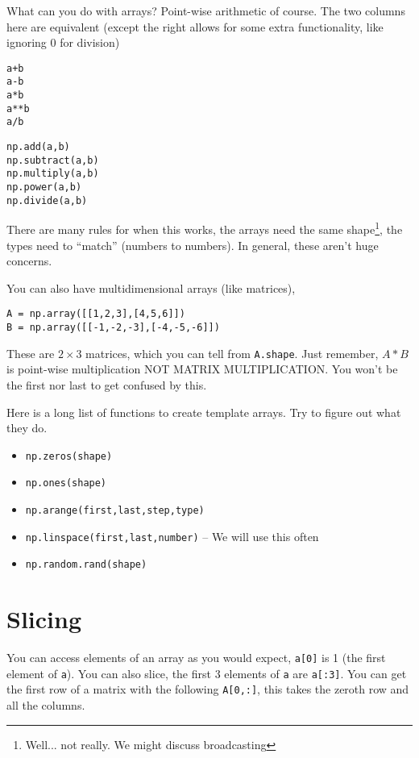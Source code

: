 \documentclass[11pt,letterpaper]{article}
\begin{document}
What can you do with arrays? Point-wise arithmetic of course. The two columns here are equivalent (except the right allows for some extra functionality, like ignoring 0 for division)

\begin{minipage}{.5\textwidth}
\begin{verbatim}
a+b
a-b
a*b
a**b
a/b
\end{verbatim}
\end{minipage}
\hfill
\begin{minipage}{.5\textwidth}
\begin{verbatim}
np.add(a,b)
np.subtract(a,b)
np.multiply(a,b)
np.power(a,b)
np.divide(a,b)
\end{verbatim}
\end{minipage}

There are many rules for when this works, the arrays need the same shape\footnote{Well... not really. We might discuss broadcasting}, the types need to ``match'' (numbers to numbers). In general, these aren't huge concerns. 

You can also have multidimensional arrays (like matrices),
\begin{verbatim}
A = np.array([[1,2,3],[4,5,6]])
B = np.array([[-1,-2,-3],[-4,-5,-6]])
\end{verbatim}
These are $2\times 3$ matrices, which you can tell from \texttt{A.shape}. Just remember, $A*B$ is point-wise multiplication NOT MATRIX MULTIPLICATION. You won't be the first nor last to get confused by this. 

Here is a long list of functions to create template arrays. Try to figure out what they do.
\begin{itemize}
 \item \texttt{np.zeros(shape)}
 \item \texttt{np.ones(shape)}
 \item \texttt{np.arange(first,last,step,type)}
 \item \texttt{np.linspace(first,last,number)} -- We will use this often
 \item \texttt{np.random.rand(shape)}
\end{itemize}


\section{Slicing}
You can access elements of an array as you would expect, \texttt{a[0]} is 1 (the first element of \texttt{a}). You can also slice, the first 3 elements of \texttt{a} are \texttt{a[:3]}. You can get the first row of a matrix with the following \texttt{A[0,:]}, this takes the zeroth row and all the columns. 
\end{document}
